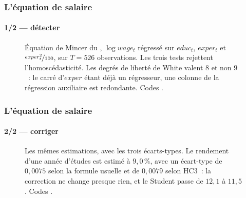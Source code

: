 \documentclass[10pt]{beamer}
\begin{document}
\begin{frame}[c]
  \frametitle{L'équation de salaire}
  \framesubtitle{1/2 --- détecter}

  \begin{figure}
    \centering
    \scalebox{.72}{}
    \caption{Équation de Mincer du , $\log wage_t$ régressé sur
      $educ_t$, $exper_t$ et $\nicefrac{exper_t^2}{100}$, sur $T=526$
      observations. Les trois tests rejettent l'homoscédasticité. Les degrés de
      liberté de White valent $8$ et non $9$~: le carré d'$exper$ étant déjà un
      régresseur, une colonne de la régression auxiliaire est redondante.
      Codes .}
  \end{figure}

\end{frame}


\begin{frame}[c]
  \frametitle{L'équation de salaire}
  \framesubtitle{2/2 --- corriger}

  \begin{figure}
    \centering
    \scalebox{.80}{}
    \caption{Les mêmes estimations, avec les trois écarts-types. Le rendement
      d'une année d'études est estimé à $9{,}0\,\%$, avec un écart-type de
      $0{,}0075$ selon la formule usuelle et de $0{,}0079$ selon HC3~: la
      correction ne change presque rien, et le Student passe de $12{,}1$ à
      $11{,}5$. Codes .}
  \end{figure}

\end{frame}
\end{document}
